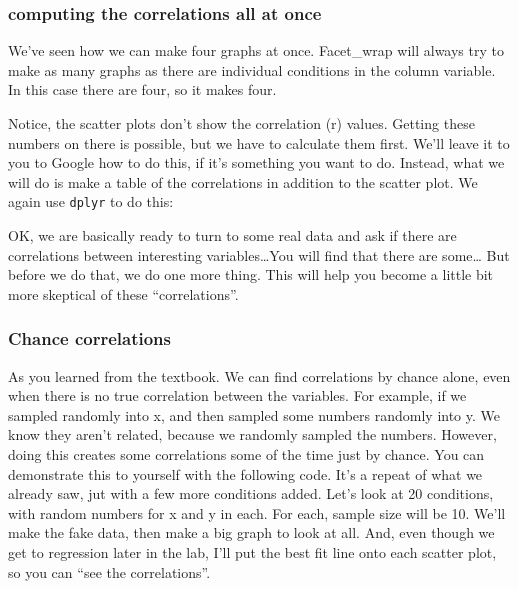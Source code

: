 \documentclass[
]{book}
\begin{document}
\hypertarget{computing-the-correlations-all-at-once}{%
\subsubsection{computing the correlations all at once}\label{computing-the-correlations-all-at-once}}

We've seen how we can make four graphs at once. Facet\_wrap will always try to make as many graphs as there are individual conditions in the column variable. In this case there are four, so it makes four.

Notice, the scatter plots don't show the correlation (r) values. Getting these numbers on there is possible, but we have to calculate them first. We'll leave it to you to Google how to do this, if it's something you want to do. Instead, what we will do is make a table of the correlations in addition to the scatter plot. We again use \texttt{dplyr} to do this:

OK, we are basically ready to turn to some real data and ask if there are correlations between interesting variables\ldots You will find that there are some\ldots{} But before we do that, we do one more thing. This will help you become a little bit more skeptical of these ``correlations''.

\hypertarget{chance-correlations}{%
\subsubsection{Chance correlations}\label{chance-correlations}}

As you learned from the textbook. We can find correlations by chance alone, even when there is no true correlation between the variables. For example, if we sampled randomly into x, and then sampled some numbers randomly into y. We know they aren't related, because we randomly sampled the numbers. However, doing this creates some correlations some of the time just by chance. You can demonstrate this to yourself with the following code. It's a repeat of what we already saw, jut with a few more conditions added. Let's look at 20 conditions, with random numbers for x and y in each. For each, sample size will be 10. We'll make the fake data, then make a big graph to look at all. And, even though we get to regression later in the lab, I'll put the best fit line onto each scatter plot, so you can ``see the correlations''.
\end{document}
